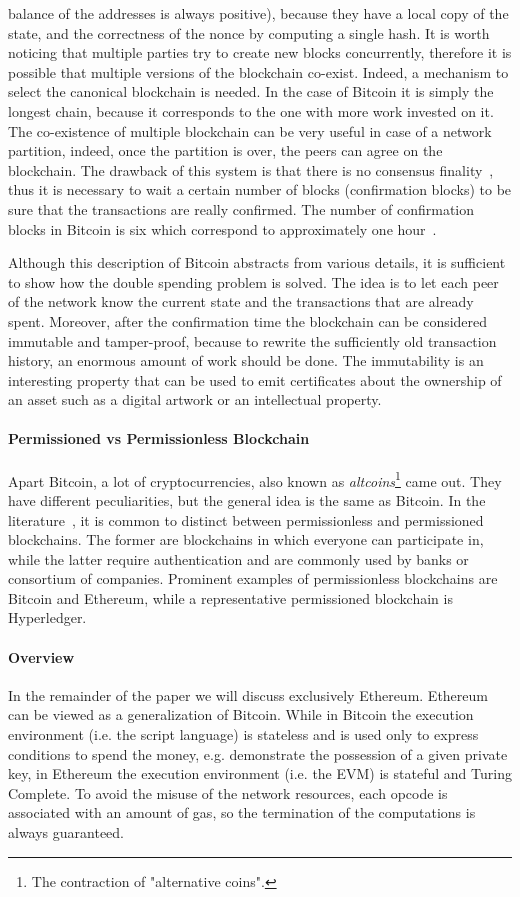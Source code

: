 balance of the addresses is always positive), because they have a local copy of
the state, and the correctness of the nonce by computing a single hash. It is
worth noticing that multiple parties try to create new blocks concurrently,
therefore it is possible that multiple versions of the blockchain co-exist.
Indeed, a mechanism to select the canonical blockchain is needed. In the case of
Bitcoin it is simply the longest chain, because it corresponds to the one with
more work invested on it. The co-existence of multiple blockchain can be very
useful in case of a network partition, indeed, once the partition is over, the
peers can agree on the blockchain. The drawback of this system is that there is
no consensus finality~\cite{bib:the-quest}, thus it is necessary to wait a
certain number of blocks (confirmation blocks) to be sure that the transactions
are really confirmed. The number of confirmation blocks in Bitcoin is six which
correspond to approximately one hour~\cite{bib:masteringbitcoin}.

Although this description of Bitcoin abstracts from various details, it is
sufficient to show how the double spending problem is solved. The idea is to let
each peer of the network know the current state and the transactions that are
already spent. Moreover, after the confirmation time the blockchain can be
considered immutable and tamper-proof, because to rewrite the sufficiently old
transaction history, an enormous amount of work should be done. The immutability
is an interesting property that can be used to emit certificates about the
ownership of an asset such as a digital artwork or an intellectual property.

\paragraph{Permissioned vs Permissionless Blockchain}
Apart Bitcoin, a lot of cryptocurrencies, also known as
\emph{altcoins}\footnote{The contraction of "alternative coins".} came out.
They have different peculiarities, but the general idea is the same as Bitcoin.
In the literature~\cite{bib:the-quest}, it is common to distinct between
permissionless and permissioned blockchains. The former are blockchains in which
everyone can participate in, while the latter require authentication and are
commonly used by banks or consortium of companies. Prominent examples of
permissionless blockchains are Bitcoin and Ethereum, while a representative
permissioned blockchain is Hyperledger.

\paragraph{Overview}
In the remainder of the paper we will discuss exclusively Ethereum. Ethereum can
be viewed as a generalization of Bitcoin. While in Bitcoin the execution
environment (i.e. the script language) is stateless and is used only to express
conditions to spend the money, e.g. demonstrate the possession of a given
private key, in Ethereum the execution environment (i.e. the EVM) is stateful
and Turing Complete. To avoid the misuse of the network resources, each opcode
is associated with an amount of gas, so the termination of the computations is
always guaranteed.

